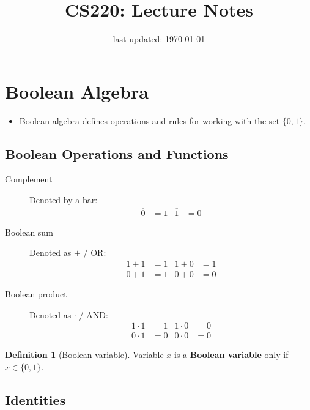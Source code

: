 \documentclass{article}
\title{CS220: Lecture Notes}
\date{last updated: \today}
\theoremstyle{definition}
\newtheorem{definition}{Definition}[section]
\begin{document}
\maketitle
\section{Boolean Algebra}
\begin{itemize}
    \item Boolean algebra defines operations and rules for working with the set $\{0,1\}$.
\end{itemize}
\subsection{Boolean Operations and Functions}
\begin{description}
    \item[Complement] Denoted by a bar:
        \begin{align*}
            \overline{0} &= 1   &   \overline{1} &= 0
        \end{align*}
    \item[Boolean sum] Denoted as $+$ / $\text{OR}$:
        \begin{align*}
            1 + 1 &= 1   &   1 + 0 &= 1   \\
            0 + 1 &= 1   &   0 + 0 &= 0
        \end{align*}
    \item[Boolean product] Denoted as $\cdot$ / $\text{AND}$:
        \begin{align*}
            1 \cdot 1 &= 1   &   1 \cdot 0 &= 0   \\
            0 \cdot 1 &= 0   &   0 \cdot 0 &= 0
        \end{align*}
\end{description}
\begin{definition}[Boolean variable] Variable $x$ is a \textbf{Boolean variable} only
    if $x \in \{0,1\}$.
\end{definition}
\subsection{Identities}
\end{document}
